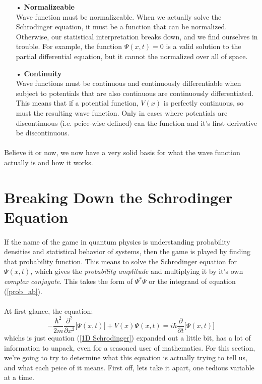 \documentclass[12pt,letterpaper]{book}
\begin{document}
\begin{enumerate}
\item[•]\textbf{Normalizeable}\\
Wave function must be normalizeable. When we actually solve the Schrodinger equation, it must be a function that can be normalized. Otherwise, our statistical interpretation breaks down, and we find ourselves in trouble. For example, the function $\Psi(x,t) = 0$ is a valid solution to the partial differential equation, but it cannot the normalized over all of space. 
\item[•]\textbf{Continuity}\\
Wave functions must be continuous and continuously differentiable when subject to potentials that are also continuous are continuously differentiated. This means that if a potential function, $V(x)$ is perfectly continuous, so must the resulting wave function. Only in cases where potentials are discontinuous (i.e. peice-wise defined) can the function and it's first derivative be discontinuous.
\end{enumerate}

\paragraph*{}Believe it or now, we now have a very solid basis for what the wave function actually is and how it works. 


\section{Breaking Down the Schrodinger Equation}
\paragraph*{}If the name of the game in quantum physics is understanding probability densities and statistical behavior of systems, then the game is played by finding that probability function. This means to solve the Schrodinger equation for $\Psi(x,t)$, which gives the \textit{probability amplitude} and multiplying it by it's own \textit{complex conjugate}. This takes the form of $\Psi^*\Psi$ or the integrand of equation (\ref{prob_ab}).
\paragraph*{}At first glance, the equation:
\begin{equation}
\label{1D Schrodinger expanded}
-\frac{\hbar^2}{2m}\frac{\partial^2}{\partial x^2}\Big[ \Psi(x,t) \Big] +
V(x)\Psi(x,t) = i\hbar\frac{\partial}{\partial t}\Big[ \Psi(x,t) \Big]
\end{equation}
whichs is just equation (\ref{1D Schrodinger}) expanded out a little bit, has a lot of information to unpack, even for a seasoned user of mathematics. For this section, we're going to try to determine what this equation is actually trying to tell us, and what each peice of it means. First off, lets take it apart, one tedious variable at a time. 
\end{document}
